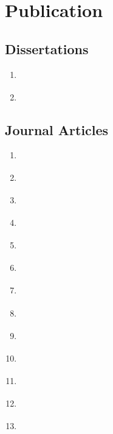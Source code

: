 \documentclass{my_cv}%
\begin{document}
\section{Publication}
\vspace{1em}
%

\subsection{\faBook \hspace{0.2em} \bfseries Dissertations}
\vspace{1em}
\begin{enumerate}
\setlength\itemsep{-0.1em}
\color{mygray}
 \item {} \cite{sreedhar2014}
 \item {} \cite{sreedhar2011}
\end{enumerate}

\subsection{\faFileTextO \hspace{0.5em}\bfseries Journal Articles}
\vspace{1em}
\begin{enumerate}
\setlength\itemsep{-0.1em}
\color{mygray}
 \item {} \cite{Mercy2022}
 \item {} \cite{Renil2022}
 \item {} \cite{Dhruv2021}
 \item {} \cite{Surendra2021}
 \item {} \cite{Sreedhar2020}
 \item {} \cite{Saini2020}
 \item {} \cite{puthiyaveettil2020}
 \item {} \cite{Nithin2019}
 \item {} \cite{maierhofer2018}
 \item {} \cite{unnikrishnakurup2017}
 \item {} \cite{thomas2017}
 \item {} \cite{sreedhar2016}
 \item {} \cite{sreedhar2012}
\end{enumerate}
\end{document}
